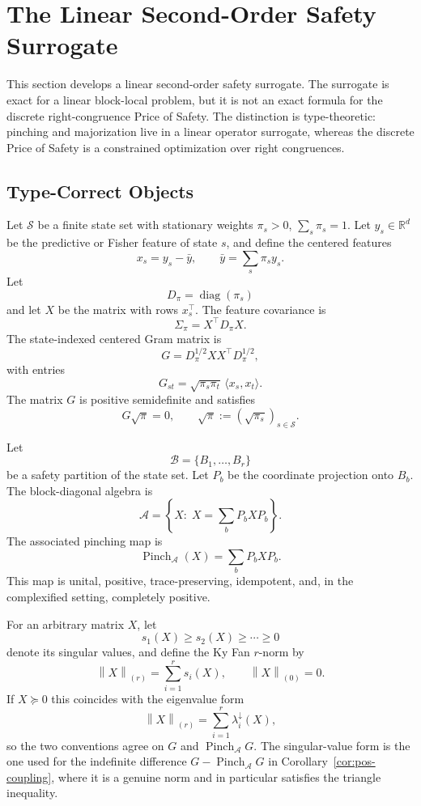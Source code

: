 \documentclass[12pt]{article}
\theoremstyle{definition}
\newcommand{\EA}{\operatorname{Pinch}_{\mathcal A}}
\newcommand{\KyF}[2]{\left\|#1\right\|_{(#2)}}
\begin{document}
\section{The Linear Second-Order Safety Surrogate}
\label{sec:pos-linear}

This section develops a linear second-order safety surrogate.  The surrogate
is exact for a linear block-local problem, but it is not an exact formula for
the discrete right-congruence Price of Safety.  The distinction is
type-theoretic: pinching and majorization live in a linear operator surrogate,
whereas the discrete Price of Safety is a constrained optimization over right
congruences.

\subsection{Type-Correct Objects}
\label{subsec:pos-objects}

Let $\mathcal S$ be a finite state set with stationary weights
$\pi_s>0$, $\sum_s\pi_s=1$.  Let $y_s\in\mathbb R^d$ be the predictive or
Fisher feature of state $s$, and define the centered features
\[
x_s=y_s-\bar y,
\qquad
\bar y=\sum_s\pi_s y_s.
\]
Let
\[
D_\pi=\operatorname{diag}(\pi_s)
\]
and let $X$ be the matrix with rows $x_s^\top$.  The feature covariance is
\[
\Sigma_\pi
=
X^\top D_\pi X.
\]
The state-indexed centered Gram matrix is
\[
G
=
D_\pi^{1/2}XX^\top D_\pi^{1/2},
\]
with entries
\[
G_{st}
=
\sqrt{\pi_s\pi_t}\,
\langle x_s,x_t\rangle.
\]
The matrix $G$ is positive semidefinite and satisfies
\[
G\sqrt{\pi}=0,
\qquad
\sqrt{\pi}:=(\sqrt{\pi_s})_{s\in\mathcal S}.
\]

Let
\[
\mathcal B=\{B_1,\dots,B_r\}
\]
be a safety partition of the state set.  Let $P_b$ be the coordinate projection
onto $B_b$.  The block-diagonal algebra is
\[
\mathcal A
=
\left\{
X:\;X=\sum_b P_bXP_b
\right\}.
\]
The associated pinching map is
\[
\EA(X)
=
\sum_b P_bXP_b.
\]
This map is unital, positive, trace-preserving, idempotent, and, in the
complexified setting, completely positive.

For an arbitrary matrix $X$, let
\[
s_1(X)\ge s_2(X)\ge\cdots\ge0
\]
denote its singular values, and define the Ky Fan $r$-norm by
\[
\KyF{X}{r}
=
\sum_{i=1}^r
s_i(X),
\qquad
\KyF{X}{0}=0.
\]
If $X\succeq0$ this coincides with the eigenvalue form
\[
\KyF{X}{r}
=
\sum_{i=1}^r
\lambda_i^\downarrow(X),
\]
so the two conventions agree on $G$ and $\EA G$.  The singular-value form is
the one used for the indefinite difference $G-\EA G$ in
Corollary~\ref{cor:pos-coupling}, where it is a genuine norm and in
particular satisfies the triangle inequality.
\end{document}
